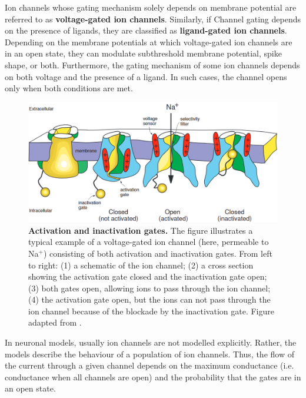 \documentclass[../main.tex]{subfiles}
\begin{document}
Ion channels whose gating mechanism solely depends on membrane potential are referred to as \textbf{voltage-gated ion channels}. Similarly, if Channel gating depends on the presence of ligands, they are classified as \textbf{ligand-gated ion channels}. Depending on the membrane potentials at which voltage-gated ion channels are in an open state, they can modulate subthreshold membrane potential, spike shape, or both. Furthermore, the gating mechanism of some ion channels depends on both voltage and the presence of a ligand. In such cases, the channel opens only when both conditions are met.

\begin{figure}[!t]
    \centering
    \includegraphics[width=0.85\linewidth]{../img/sleep_and_r5_network/structure_of_v_gated_channels.png}
    \caption[Activation and inactivation gates]{
        \textbf{Activation and inactivation gates.}
        The figure illustrates a typical example of a voltage-gated ion channel (here, permeable to Na$^+$) consisting of both activation and inactivation gates. From left to right: (1) a schematic of the ion channel; (2) a cross section showing the activation gate closed and the inactivation gate open; (3) both gates open, allowing ions to pass through the ion channel; (4) the activation gate open, but the ions can not pass through the ion channel because of the blockade by the inactivation gate.
        Figure adapted from \parencite{izhikevichDynamicalSystemsNeuroscience2006}.
    }
    \label{fig:voltage_gated_channel_structure}
\end{figure}

In neuronal models, usually ion channels are not modelled explicitly. Rather, the models describe the behaviour of a population of ion channels. Thus, the flow of the current through a given channel depends on the maximum conductance (i.e. conductance when all channels are open) and the probability that the gates are in an open state.%
\end{document}
